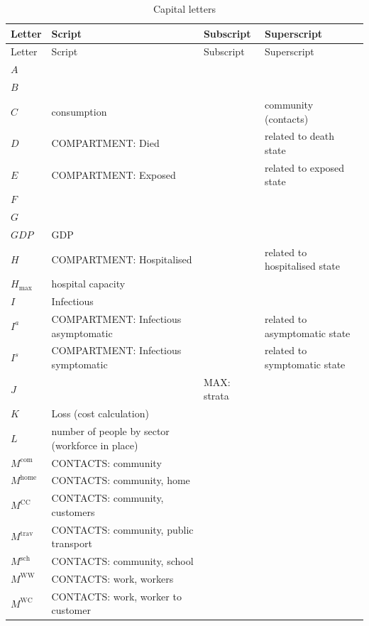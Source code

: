 \documentclass[
]{article}
\begin{document}
\begin{longtable}[]{@{}
  >{\centering\arraybackslash}p{}
  >{\centering\arraybackslash}p{}
  >{\centering\arraybackslash}p{}
  >{\centering\arraybackslash}p{}@{}}
\caption{Capital letters}\tabularnewline
\toprule
Letter & Script & Subscript & Superscript \\
\midrule
\endfirsthead
\toprule
Letter & Script & Subscript & Superscript \\
\midrule
\endhead
\(A\) & & & \\
\(B\) & & & \\
\(C\) & consumption & & community (contacts) \\
\(D\) & COMPARTMENT: Died & & related to death state \\
\(E\) & COMPARTMENT: Exposed & & related to exposed state \\
\(F\) & & & \\
\(G\) & & & \\
\(GDP\) & GDP & & \\
\(H\) & COMPARTMENT: Hospitalised & & related to hospitalised state \\
\(H_{\text{max}}\) & hospital capacity & & \\
\(I\) & Infectious & & \\
\(I^{a}\) & COMPARTMENT: Infectious
asymptomatic & & related to asymptomatic state \\
\(I^{s}\) & COMPARTMENT: Infectious
symptomatic & & related to symptomatic state \\
\(J\) & & MAX: strata & \\
\(K\) & Loss (cost calculation) & & \\
\(L\) & number of people by sector
(workforce in place) & & \\
\(M^{\text{com}}\) & CONTACTS: community & & \\
\(M^{\text{home}}\) & CONTACTS: community, home & & \\
\(M^{\text{CC}}\) & CONTACTS: community, customers & & \\
\(M^{\text{trav}}\) & CONTACTS: community, public
transport & & \\
\(M^{\text{sch}}\) & CONTACTS: community, school & & \\
\(M^{\text{WW}}\) & CONTACTS: work, workers & & \\
\(M^{\text{WC}}\) & CONTACTS: work, worker to
customer & & \\

\end{longtable}
\end{document}
